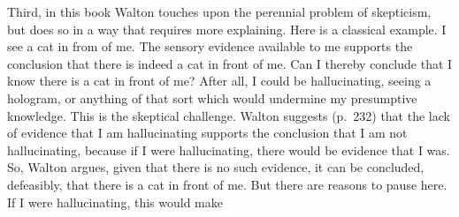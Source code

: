 \documentclass[12pt,a4paper]{article}
\begin{document}



Third, in this book Walton touches upon the 
perennial problem of skepticism, but does so in a way that requires 
more explaining. Here is a classical example. 
I see a cat in from of me. The sensory evidence available to me supports 
the conclusion that there is indeed a cat in front of me. 
Can I thereby conclude that I know there is a cat in front of me?
After all, I could be hallucinating, seeing a hologram, or anything of 
that sort which would undermine my presumptive knowledge. This is the skeptical challenge.
Walton suggests (p.\ 232) that the lack of evidence that I am hallucinating supports the conclusion
that I am not hallucinating, because if I were hallucinating, there would be
evidence that I was. So, Walton argues, given that there is no such
evidence, it can be concluded, defeasibly, that 
there is a cat in front of me.  
But there are reasons to pause here. If I were hallucinating, this would make 
\end{document}
